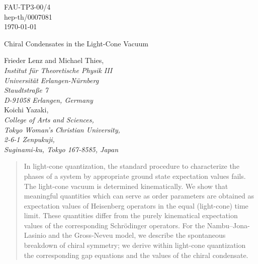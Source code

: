 \documentclass[a4paper,12pt]{article}
\begin{document}
\thispagestyle{empty}
\noindent\hspace*{\fill}  FAU-TP3-00/4 \\
\noindent\hspace*{\fill}  hep-th/0007081 \\
\noindent\hspace*{\fill}  \today   \\

\begin{center}\begin{Large}\begin{bf}
Chiral Condensates in the  Light-Cone Vacuum \\
\end{bf}\end{Large}\vspace{.75cm}
 \vspace{0.5cm}
Frieder Lenz and Michael Thies,\\
\vskip 0.2cm
{\em Institut f\"ur Theoretische Physik III \\
Universit\"at Erlangen-N\"urnberg \\
Staudtstra{\ss}e 7 \\
D-91058 Erlangen, Germany} \\
\vskip 0.4cm
Koichi Yazaki,\\
\vskip 0.2cm
{\em College of Arts and Sciences,\\
Tokyo Woman's Christian University,\\
2-6-1 Zenpukuji,\\
Suginami-ku, Tokyo 167-8585, Japan}
\end{center}
\vspace{1cm}\baselineskip=35pt

\date{\today}
%
\begin{abstract} \noindent
In light-cone quantization, the standard procedure to characterize the phases of a system
by appropriate ground state expectation values fails. The light-cone vacuum is determined
kinematically. We show that meaningful quantities which can serve as order parameters
are obtained as expectation values of Heisenberg operators in the equal (light-cone)
time limit. These quantities differ from the purely kinematical expectation values of the
corresponding Schr\"odinger operators. For the Nambu--Jona-Lasinio and the
Gross-Neveu model, we describe the spontaneous breakdown of chiral symmetry;
we derive within light-cone quantization the corresponding gap equations and the values
of the chiral condensate.
\end{abstract}
\end{document}
